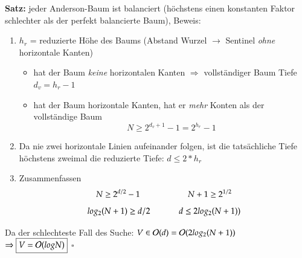 \textbf{Satz:} jeder Anderson-Baum ist balanciert (höchstens einen konstanten Faktor schlechter als der perfekt balancierte Baum), Beweis:
\begin{enumerate}
    \item $h_r$ = reduzierte Höhe des Baums (Abstand Wurzel $\rightarrow$ Sentinel \emph{ohne} horizontale Kanten)
    \begin{itemize}
        \item hat der Baum \emph{keine} horizontalen Kanten $\Rightarrow$ vollständiger Baum Tiefe $d_v = h_r - 1$
        \item hat der Baum horizontale Kanten, hat er \emph{mehr} Konten als der vollständige Baum
        \[ N \geq 2^{d_v +1} - 1 = 2^{h_r}-1\]
    \end{itemize}
    \item Da nie zwei horizontale Linien aufeinander folgen, ist die tatsächliche Tiefe höchstens zweimal die reduzierte Tiefe: $d \leq 2 * h_r$
    \item Zusammenfassen
    \[ N \geq 2^{d/2} - 1 \hspace*{2cm} N+1 \geq 2^{1/2} \]
    \[ log_2(N+1) \geq d/2 \hspace*{1.2cm} d \leq 2 log_2(N+1)) \]
\end{enumerate}
Da der schlechteste Fall des Suche: $V \in \mathcal{O}{}(d) = \mathcal{O}{}(2 log_2(N+1))$\\
\hspace*{6.45cm} $\Rightarrow \boxed{V = \mathcal{O}{}(log N)}$ \hspace*{5cm} $\square$ \\


